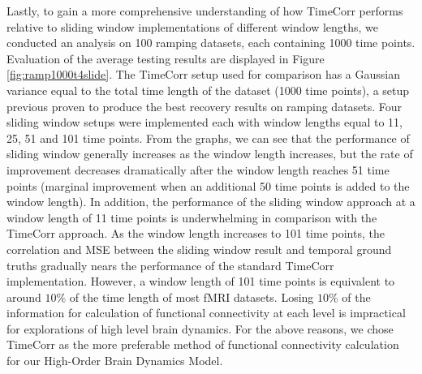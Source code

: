 \documentclass[11pt]{article}
\begin{document}
Lastly, to gain a more comprehensive understanding of how TimeCorr performs relative to sliding window implementations of different window lengths, we conducted an analysis on 100 ramping datasets, each containing 1000 time points. Evaluation of the average testing results are displayed in Figure \ref{fig:ramp1000t4slide}. The TimeCorr setup used for comparison has a Gaussian variance equal to the total time length of the dataset (1000 time points), a setup previous proven to produce the best recovery results on ramping datasets. Four sliding window setups were implemented each with window lengths equal to 11, 25, 51 and 101 time points. From the graphs, we can see that the performance of sliding window generally increases as the window length increases, but the rate of improvement decreases dramatically after the window length reaches 51 time points (marginal improvement when an additional 50 time points is added to the window length). In addition, the performance of the sliding window approach at a window length of 11 time points is underwhelming in comparison with the TimeCorr approach. As the window length increases to 101 time points, the correlation and MSE between the sliding window result and temporal ground truths gradually nears the performance of the standard TimeCorr implementation. However, a window length of 101 time points is equivalent to around $10\%$ of the time length of most fMRI datasets. Losing $10\%$ of the information for calculation of functional connectivity at each level is impractical for explorations of high level brain dynamics. For the above reasons, we chose TimeCorr as the more preferable method of functional connectivity calculation for our High-Order Brain Dynamics Model.
\end{document}
